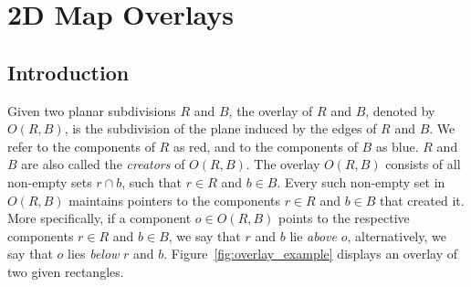 



\chapter{2D Map Overlays}
\label{chap:map_overlay_2_ref}
\section{Introduction}

Given two planar subdivisions $R$ and $B$, 
the overlay of $R$ and $B$, 
denoted by $O(R,B)$, is the subdivision of the plane 
induced by the edges of $R$ and $B$.
We refer to the components of $R$ as red, 
and to the components of $B$ as blue.
$R$ and $B$ are also called the {\em creators} of $O(R,B)$.
The overlay $O(R,B)$ consists of all non-empty sets $r \cap b$, 
such that $r \in R$ and $b \in B$. 
Every such non-empty set in $O(R,B)$ maintains 
pointers to the components $r \in R$ and $b \in B$ that created it.
More specifically, if a component $o \in O(R,B)$ points 
to the respective components $r \in R$ and $b \in B$, 
we say that $r$ and $b$ lie {\em above} $o$, 
alternatively, we say that $o$ lies {\em below} $r$ and $b$.
Figure~\ref{fig:overlay_example} displays an overlay 
of two given rectangles.


